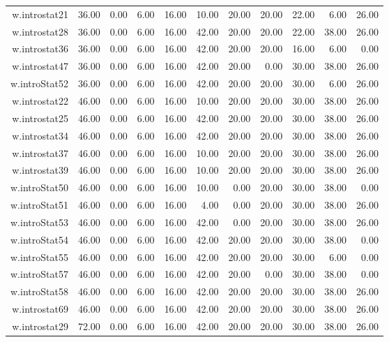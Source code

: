 \documentclass[12pt,english,nohyper]{tufte-handout}\usepackage[]{graphicx}\usepackage[]{color}
\begin{document}
\begin{longtable}{rrrrrrrrrrr}
  w.introstat21 & 36.00 & 0.00 & 6.00 & 16.00 & 10.00 & 20.00 & 20.00 & 22.00 & 6.00 & 26.00 \\ 
  w.introstat28 & 36.00 & 0.00 & 6.00 & 16.00 & 42.00 & 20.00 & 20.00 & 22.00 & 38.00 & 26.00 \\ 
  w.introstat36 & 36.00 & 0.00 & 6.00 & 16.00 & 42.00 & 20.00 & 20.00 & 16.00 & 6.00 & 0.00 \\ 
  w.introstat47 & 36.00 & 0.00 & 6.00 & 16.00 & 42.00 & 20.00 & 0.00 & 30.00 & 38.00 & 26.00 \\ 
  w.introStat52 & 36.00 & 0.00 & 6.00 & 16.00 & 42.00 & 20.00 & 20.00 & 30.00 & 6.00 & 26.00 \\ 
  w.introstat22 & 46.00 & 0.00 & 6.00 & 16.00 & 10.00 & 20.00 & 20.00 & 30.00 & 38.00 & 26.00 \\ 
  w.introstat25 & 46.00 & 0.00 & 6.00 & 16.00 & 42.00 & 20.00 & 20.00 & 30.00 & 38.00 & 26.00 \\ 
  w.introstat34 & 46.00 & 0.00 & 6.00 & 16.00 & 42.00 & 20.00 & 20.00 & 30.00 & 38.00 & 26.00 \\ 
  w.introstat37 & 46.00 & 0.00 & 6.00 & 16.00 & 10.00 & 20.00 & 20.00 & 30.00 & 38.00 & 26.00 \\ 
  w.introstat39 & 46.00 & 0.00 & 6.00 & 16.00 & 10.00 & 20.00 & 20.00 & 30.00 & 38.00 & 26.00 \\ 
  w.introStat50 & 46.00 & 0.00 & 6.00 & 16.00 & 10.00 & 0.00 & 20.00 & 30.00 & 38.00 & 0.00 \\ 
  w.introStat51 & 46.00 & 0.00 & 6.00 & 16.00 & 4.00 & 0.00 & 20.00 & 30.00 & 38.00 & 26.00 \\ 
  w.introStat53 & 46.00 & 0.00 & 6.00 & 16.00 & 42.00 & 0.00 & 20.00 & 30.00 & 38.00 & 26.00 \\ 
  w.introStat54 & 46.00 & 0.00 & 6.00 & 16.00 & 42.00 & 20.00 & 20.00 & 30.00 & 38.00 & 0.00 \\ 
  w.introStat55 & 46.00 & 0.00 & 6.00 & 16.00 & 42.00 & 20.00 & 20.00 & 30.00 & 6.00 & 0.00 \\ 
  w.introStat57 & 46.00 & 0.00 & 6.00 & 16.00 & 42.00 & 20.00 & 0.00 & 30.00 & 38.00 & 0.00 \\ 
  w.introStat58 & 46.00 & 0.00 & 6.00 & 16.00 & 42.00 & 20.00 & 20.00 & 30.00 & 38.00 & 26.00 \\ 
  w.introstat69 & 46.00 & 0.00 & 6.00 & 16.00 & 42.00 & 20.00 & 20.00 & 30.00 & 38.00 & 26.00 \\ 
  w.introstat29 & 72.00 & 0.00 & 6.00 & 16.00 & 42.00 & 20.00 & 20.00 & 30.00 & 38.00 & 26.00 \\ 

\end{longtable}
\end{document}
